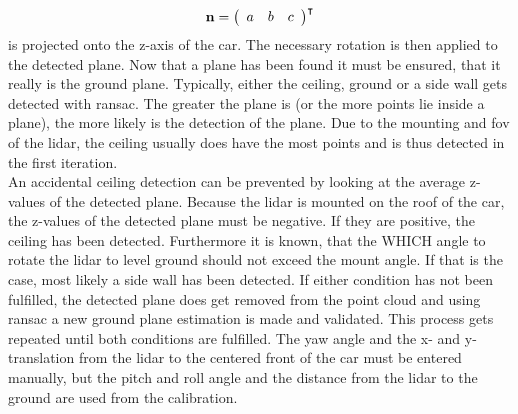 \begin{equation}
	\vb{n} = \left(\begin{array}{lll} a & b & c \end{array}\right)^{\intercal}
\end{equation}
is projected onto the z-axis of the car.
The necessary rotation is then applied to the detected plane.
Now that a plane has been found it must be ensured, that it really is the ground plane.
Typically, either the ceiling, ground or a side wall gets detected with \gls{ransac}.
The greater the plane is (or the more points lie inside a plane), the more likely is the detection of the plane.
Due to the mounting and \gls{fov} of the \gls{lidar}, the ceiling usually does have the most points and is thus detected in the first iteration.\\
An accidental ceiling detection can be prevented by looking at the average z-values of the detected plane.
Because the \gls{lidar} is mounted on the roof of the car, the z-values of the detected plane must be negative.
If they are positive, the ceiling has been detected.
Furthermore it is known, that the WHICH angle to rotate the \gls{lidar} to level ground should not exceed the mount angle.
If that is the case, most likely a side wall has been detected.
If either condition has not been fulfilled, the detected plane does get removed from the point cloud and using \gls{ransac} a new ground plane estimation is made and validated.
This process gets repeated until both conditions are fulfilled.
The yaw angle and the x- and y-translation from the \gls{lidar} to the centered front of the car
must be entered manually, but the pitch and roll angle and the distance from the \gls{lidar} to the ground are used from the calibration.


